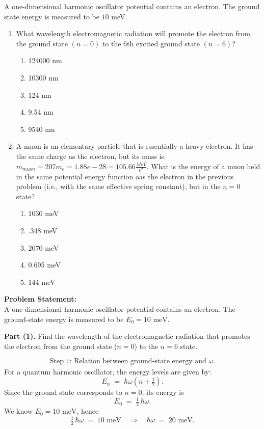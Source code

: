 \documentclass[12pt]{article}
\title{}
\author{Jerich Lee}
\date{\today}
\theoremstyle{definition} %
\theoremstyle{plain} %
\begin{document}
\maketitle
A one-dimensional harmonic oscillator potential contains an electron. The ground state energy is measured to be $10$ meV. 
\noindent
\begin{enumerate}
    \item What wavelength electromagnetic radiation will promote the electron from the ground state $(n=0)$ to the 6th excited ground state $(n=6)$? 
    \noindent
    \begin{enumerate}
        \item 124000 nm
        \item 10300 nm
        \item 124 nm
        \item 9.54 nm
        \item 9540 nm
    \end{enumerate}
    \item A muon is an elementary particle that is essentially a heavy electron. It has the same charge as the electron, but its mass is $m_{muon}=207 m_e = 1.88e-28= 105.66 \frac{MeV}{c^{2}}$. What is the energy of a muon held in the same potential energy function oas the electron in the previous problem (i.e., with the same effective spring constant), but in the $n=0$ state?
    \noindent
    \begin{enumerate}
        \item 1030 meV
        \item .348 meV
        \item 2070 meV
        \item 0.695 meV
        \item 144 meV
    \end{enumerate}
\end{enumerate}

\noindent \textbf{Problem Statement:}\\
A one-dimensional harmonic oscillator potential contains an electron. 
The ground-state energy is measured to be $E_{0} = 10\text{ meV}$. 

\noindent\textbf{Part (1).} 
Find the wavelength of the electromagnetic radiation that promotes the electron from the ground state ($n=0$) to the $n=6$ state.

\[
\underline{\text{Step 1: Relation between ground-state energy and } \omega.}
\]
For a quantum harmonic oscillator, the energy levels are given by:
\[
E_{n} \;=\; \hbar \omega \left(n + \tfrac12 \right).
\]
Since the ground state corresponds to $n=0$, its energy is
\[
E_{0} \;=\; \tfrac12 \,\hbar \omega.
\]
We know $E_{0} = 10\text{ meV}$, hence
\[
\tfrac12 \,\hbar \omega \;=\; 10\text{ meV} 
\quad\Longrightarrow\quad
\hbar \omega \;=\; 20\text{ meV}.
\]
\end{document}
